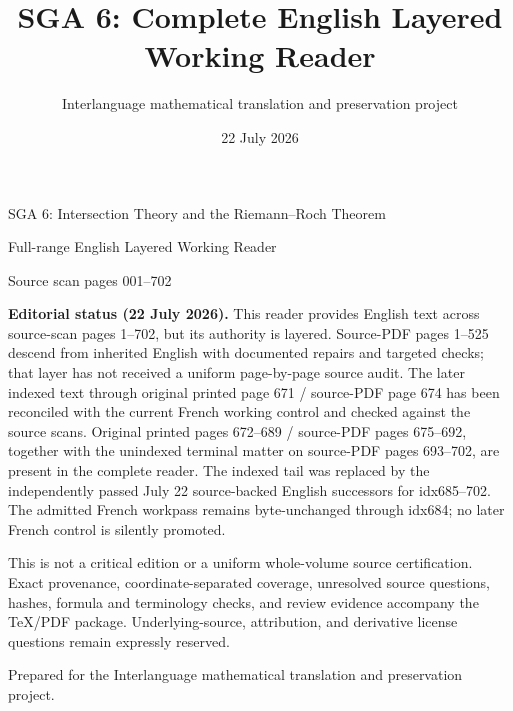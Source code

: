 \documentclass[11pt]{article}
\title{SGA 6: Complete English Layered Working Reader}
\author{Interlanguage mathematical translation and preservation project}
\date{22 July 2026}
\begin{document}
\begin{titlepage}
\thispagestyle{empty}
\begin{center}
\vspace*{0.12\textheight}
{\LARGE SGA 6: Intersection Theory and the Riemann--Roch Theorem\par}
\vspace{1.2em}
{\Large Full-range English Layered Working Reader\par}
\vspace{2.5em}
{\large Source scan pages 001--702\par}
\vfill
\end{center}

\textbf{Editorial status (22 July 2026).}
This reader provides English text across source-scan pages 1--702, but its
authority is layered.  Source-PDF pages 1--525 descend from inherited English
with documented repairs and targeted checks; that layer has not received a
uniform page-by-page source audit.  The later indexed text through original
printed page 671 / source-PDF page 674 has been reconciled with the current
French working control and checked against the source scans.  Original
printed pages 672--689 / source-PDF pages 675--692, together with the
unindexed terminal matter on source-PDF pages 693--702, are present in the
complete reader.  The indexed tail was replaced by the independently passed
July 22 source-backed English successors for idx685--702.  The admitted French
workpass remains byte-unchanged through idx684; no later French control is
silently promoted.

This is not a critical edition or a uniform whole-volume source
certification.  Exact provenance, coordinate-separated coverage, unresolved
source questions, hashes, formula and terminology checks, and review evidence
accompany the TeX/PDF package.  Underlying-source, attribution, and derivative
license questions remain expressly reserved.
\vfill
\begin{center}
Prepared for the Interlanguage mathematical translation and preservation project.
\end{center}
\end{titlepage}



\clearpage


\end{document}
